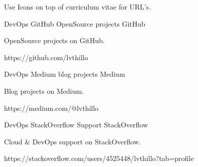 

\begin{cventries}

  \cventry
    {Use Icons on top of curriculum vitae for URL's.}
    {} %
    {} %
    {} %
    {}

  \cventry
    {DevOps} %
    {GitHub OpenSource projects} %
    {GitHub} %
    {} %
    {
      \begin{cvitems} %
        \item {OpenSource projects on GitHub.}
        \item {https://github.com/lvthillo}
      \end{cvitems}
    }

  \cventry
    {DevOps} %
    {Medium blog projects} %
    {Medium} %
    {} %
    {
      \begin{cvitems} %
        \item {Blog projects on Medium.}
        \item {https://medium.com/@lvthillo}
      \end{cvitems}
    }

  \cventry
    {DevOps} %
    {StackOverflow Support} %
    {StackOverflow} %
    {} %
    {
      \begin{cvitems} %
        \item {Cloud \& DevOps support on StackOverflow.}
        \item {https://stackoverflow.com/users/4525448/lvthillo?tab=profile}
      \end{cvitems}
    }

\end{cventries}
